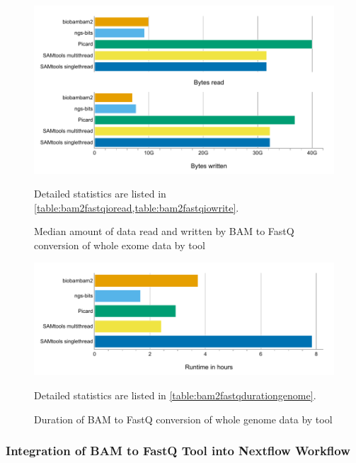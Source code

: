 \begin{figure}[H]
    \centering
	\includegraphics[width=\linewidth,height=\textheight,keepaspectratio]{bam2fastqbenchmark_io}
	\caption[Median amount of data read and written by BAM to FastQ conversion of whole exome data by tool]{Median amount of data read and written by BAM to FastQ conversion of whole exome data by tool}{Detailed statistics are listed in \cref{table:bam2fastqioread,table:bam2fastqiowrite}.}
	\label{figure:bam2fastqbenchmarkio}
\end{figure}

\begin{figure}[H]
    \centering
	\includegraphics[width=\linewidth,height=\textheight,keepaspectratio]{bam2fastqbenchmark_runtime_genome}
	\caption[Duration of BAM to FastQ conversion of whole genome data by tool]{Duration of BAM to FastQ conversion of whole genome data by tool}{Detailed statistics are listed in \cref{table:bam2fastqdurationgenome}.}
	\label{figure:bam2fastqbenchmarkruntimegenome}
\end{figure}

\subsubsection{Integration of BAM to FastQ Tool into Nextflow Workflow}

